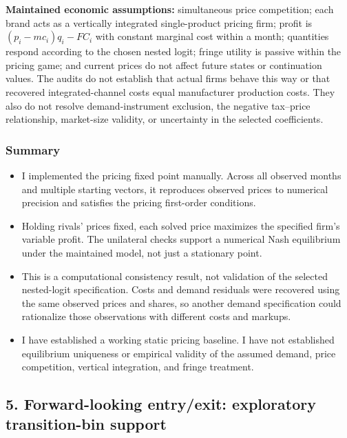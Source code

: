 \documentclass[10pt,]{article}
\begin{document}
\textbf{Maintained economic assumptions:} simultaneous price
competition; each brand acts as a vertically integrated single-product
pricing firm; profit is \((p_i-mc_i)q_i-FC_i\) with constant marginal
cost within a month; quantities respond according to the chosen nested
logit; fringe utility is passive within the pricing game; and current
prices do not affect future states or continuation values. The audits do
not establish that actual firms behave this way or that recovered
integrated-channel costs equal manufacturer production costs. They also
do not resolve demand-instrument exclusion, the negative tax--price
relationship, market-size validity, or uncertainty in the selected
coefficients.

\subsubsection{Summary}\label{summary}

\begin{itemize}
\item
  I implemented the pricing fixed point manually. Across all observed
  months and multiple starting vectors, it reproduces observed prices to
  numerical precision and satisfies the pricing first-order conditions.
\item
  Holding rivals' prices fixed, each solved price maximizes the
  specified firm's variable profit. The unilateral checks support a
  numerical Nash equilibrium under the maintained model, not just a
  stationary point.
\item
  This is a computational consistency result, not validation of the
  selected nested-logit specification. Costs and demand residuals were
  recovered using the same observed prices and shares, so another demand
  specification could rationalize those observations with different
  costs and markups.
\item
  I have established a working static pricing baseline. I have not
  established equilibrium uniqueness or empirical validity of the
  assumed demand, price competition, vertical integration, and fringe
  treatment.
\end{itemize}

\subsection{5. Forward-looking entry/exit: exploratory transition-bin
support}\label{forward-looking-entryexit-exploratory-transition-bin-support}
\end{document}
